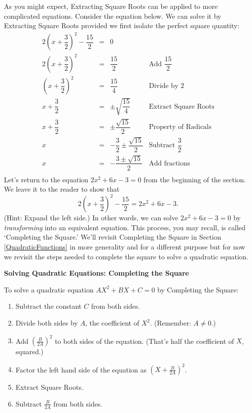 \documentclass[10pt]{article}
\begin{document}
As you might expect, Extracting Square Roots can be applied to more complicated equations.  Consider the equation below.  We can solve it by Extracting Square Roots provided we first isolate the perfect square quantity:\[ \begin{array}{rclr}

2\left(x + \dfrac{3}{2}\right)^2 - \dfrac{15}{2} & = & 0 & \\ [8pt]
2\left(x + \dfrac{3}{2}\right)^2 & = & \dfrac{15}{2} & \text{Add $\dfrac{15}{2}$} \\
\left(x + \dfrac{3}{2}\right)^2 & = & \dfrac{15}{4} & \text{Divide by $2$} \\
x + \dfrac{3}{2} & = & \pm \sqrt{\dfrac{15}{4}} & \text{Extract Square Roots} \\ [8pt]
x + \dfrac{3}{2} & = & \pm \dfrac{\sqrt{15}}{2} & \text{Property of Radicals} \\ [5pt]
x & = & -\dfrac{3}{2} \pm \dfrac{\sqrt{15}}{2}  & \text{Subtract $\dfrac{3}{2}$} \\ [8pt]
x & = & -\dfrac{3 \pm \sqrt{15}}{2}  & \text{Add fractions} \\

\end{array} \] Let's return to the equation $2x^2 + 6x - 3 = 0$ from the beginning of the section.  We leave it to the reader to show that \[2\left(x + \dfrac{3}{2}\right)^2 - \dfrac{15}{2} =  2x^2 + 6x - 3. \] (Hint: Expand the left side.)  In other words, we can solve $2x^2 + 6x - 3 = 0$  by \textit{transforming} into an equivalent equation. This process, you may recall, is called `Completing the Square.'  We'll revisit Completing the Square in Section \ref{QuadraticFunctions} in more generality and for a different purpose but for now we revisit the steps needed to complete the square to solve a quadratic equation.

\medskip

\label{completesquareeqns}

\colorbox{ResultColor}{\bbm

\centerline{\textbf{Solving Quadratic Equations:  Completing the Square}}
\vspace{0.05in}
To solve a quadratic equation $AX^2 + BX + C = 0$ by Completing the Square:

\begin{enumerate}

\item  Subtract the constant $C$ from both sides.
\item  Divide both sides by $A$,  the coefficient of $X^2$.  (Remember:  $A \neq 0$.)
\item  Add $\left(\frac{B}{2A}\right)^2$ to both sides of the equation. (That's half the coefficient of $X$, squared.)
\vspace{-0.1in}
\item  Factor the left hand side of the equation as $\left(X + \frac{B}{2A}\right)^2$.
\item  Extract Square Roots.
\item  Subtract $\frac{B}{2A}$ from both sides.

\end{enumerate}

\ebm}
\end{document}
